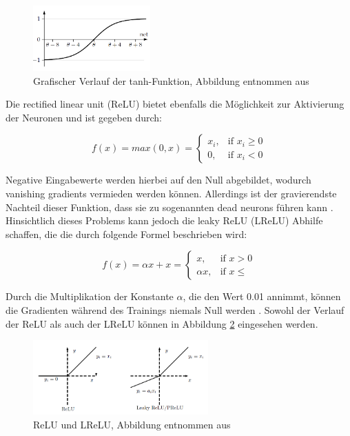 \documentclass[12pt,a4paper]{article}
\begin{document}
\begin{figure}
\centering
\includegraphics[width=0.4\textwidth]{pics/tanh.png}	
\caption{Grafischer Verlauf der tanh-Funktion, Abbildung entnommen aus \cite[S. 45]{Kruse2015}}
\label{fig:tanh}
\end{figure}

Die rectified linear unit (ReLU) bietet ebenfalls die Möglichkeit zur Aktivierung der Neuronen und ist gegeben durch:


\begin{equation}
 f(x) = max (0, x) = 
\begin{cases}
      x_i, & \text{if $x_i \geq 0$}\\
      0, & \text{if $x_i<0$}
    \end{cases}
\end{equation}

Negative Eingabewerte werden hierbei auf den Null abgebildet, wodurch vanishing gradients vermieden werden können. Allerdings ist der gravierendste Nachteil dieser Funktion, dass sie zu sogenannten \glqq{}dead neurons\grqq{} führen kann \cite{Nwankpa2018}. 
Hinsichtlich dieses Problems kann jedoch die leaky ReLU (LReLU) Abhilfe schaffen, die die durch folgende Formel beschrieben wird:

\begin{equation}
 f(x) = \alpha x + x = 
\begin{cases}
      x, & \text{if $x > 0$}\\
      \alpha x, & \text{if $x \leq $}
    \end{cases}
\end{equation}

Durch die Multiplikation der Konstante $\alpha$, die den Wert 0.01 annimmt, können die Gradienten während des Trainings niemals Null werden \cite{Nwankpa2018}. Sowohl der Verlauf der ReLU als auch der LReLU können in Abbildung \ref{fig:relu} eingesehen werden.

\begin{figure}
\centering
\includegraphics[width=0.6\textwidth]{pics/l_relu.png}	
\caption{ReLU und LReLU, Abbildung entnommen aus \cite{Xu2015} }
\label{fig:relu}
\end{figure}
\end{document}
